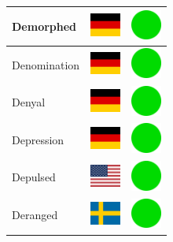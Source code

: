 \documentclass[12pt, a4paper, twoside]{report}
\begin{document}
\begin{center}
\begin{longtable}{|p{5cm}|p{2cm}|p{2cm}|}
 Demorphed                                                  & \includegraphics[width=1cm]{../img/flags/de} &   \includegraphics[width=1cm]{../likes/y} \\ \hline
 Denomination                                               & \includegraphics[width=1cm]{../img/flags/de} &   \includegraphics[width=1cm]{../likes/y} \\ \hline
 Denyal                                                     & \includegraphics[width=1cm]{../img/flags/de} &   \includegraphics[width=1cm]{../likes/y} \\ \hline
 Depression                                                 & \includegraphics[width=1cm]{../img/flags/de} &   \includegraphics[width=1cm]{../likes/y} \\ \hline
 Depulsed                                                   & \includegraphics[width=1cm]{../img/flags/us} &   \includegraphics[width=1cm]{../likes/y} \\ \hline
 Deranged                                                   & \includegraphics[width=1cm]{../img/flags/se} &   \includegraphics[width=1cm]{../likes/y} \\ \hline

\end{longtable}
\end{center}
\end{document}
